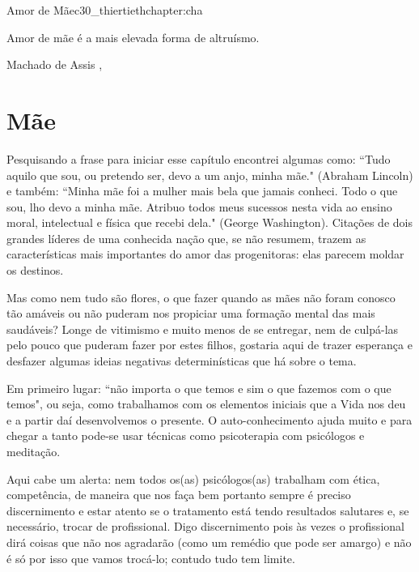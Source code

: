 \begin{chapterpage}{Amor de Mãe}{c30_thiertiethchapter:cha}

\begin{myquotation}Amor de mãe é a mais elevada forma de altruísmo.

\par\vspace*{15mm}
\mbox{}\hfill \emdash{}Machado de Assis 
, %
\par\end{myquotation}

\end{chapterpage}



\section{Mãe}\label{c1_basicformatting:sec}

\emdash{}Pesquisando a frase para iniciar esse capítulo encontrei algumas como: ``Tudo aquilo que sou, ou pretendo ser, devo a um anjo, minha mãe." (Abraham Lincoln) e também: ``Minha mãe foi a mulher mais bela que jamais conheci. Todo o que sou, lho devo a minha mãe. Atribuo todos meus sucessos nesta vida ao ensino moral, intelectual e física que recebi dela." (George Washington). Citações de dois grandes líderes de uma conhecida nação que, se não resumem, trazem as características mais importantes do amor das progenitoras: elas parecem moldar os destinos.

\emdash{}Mas como nem tudo são flores, o que fazer quando as mães não foram conosco tão amáveis ou não puderam nos propiciar uma formação mental das mais saudáveis? Longe de vitimismo e muito menos de se entregar, nem de culpá-las pelo pouco que puderam fazer por estes filhos, gostaria aqui de trazer esperança e desfazer algumas ideias negativas determinísticas que há sobre o tema.

\emdash{}Em primeiro lugar: ``não importa o que temos e sim o que fazemos com o que temos", ou seja, como trabalhamos com os elementos iniciais que a Vida nos deu e a partir daí desenvolvemos o presente. O auto-conhecimento ajuda muito e para chegar a tanto pode-se usar técnicas como psicoterapia com psicólogos e meditação.

\emdash{}Aqui cabe um alerta: nem todos os(as) psicólogos(as) trabalham com ética, competência, de maneira que nos faça bem portanto sempre é preciso discernimento e estar atento se o tratamento está tendo resultados salutares e, se necessário, trocar de profissional. Digo discernimento pois às vezes o profissional dirá coisas que não nos agradarão (como um remédio que pode ser amargo) e não é só por isso que vamos trocá-lo; contudo tudo tem limite.

